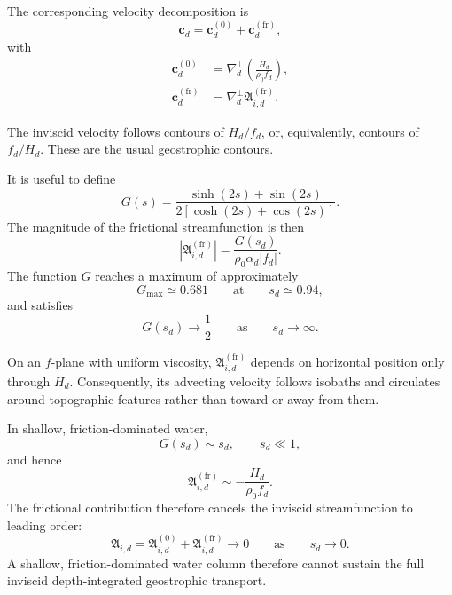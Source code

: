 \documentclass[10pt]{amsart}
\begin{document}
The corresponding velocity decomposition is
\begin{equation}
\boldsymbol c_d
=
\boldsymbol c_d^{(0)}
+
\boldsymbol c_d^{(\mathrm{fr})},
\end{equation}
with
\begin{subequations}
\begin{align}
\boldsymbol c_d^{(0)}
&=
\nabla_d^\perp
\left(
\frac{H_d}{\rho_0f_d}
\right),
\\
\boldsymbol c_d^{(\mathrm{fr})}
&=
\nabla_d^\perp
\mathfrak A_{i,d}^{(\mathrm{fr})}.
\end{align}
\end{subequations}

The inviscid velocity follows contours of \(H_d/f_d\), or,
equivalently, contours of \(f_d/H_d\). These are the usual
geostrophic contours.

It is useful to define
\begin{equation}
G(s)
=
\frac{
\sinh(2s)+\sin(2s)
}{
2\left[
\cosh(2s)+\cos(2s)
\right]
}.
\end{equation}
The magnitude of the frictional streamfunction is then
\begin{equation}
\left|
\mathfrak A_{i,d}^{(\mathrm{fr})}
\right|
=
\frac{G(s_d)}
{\rho_0\alpha_d|f_d|}.
\end{equation}
The function \(G\) reaches a maximum of approximately
\begin{equation}
G_{\max}\simeq0.681
\qquad\text{at}\qquad
s_d\simeq0.94,
\end{equation}
and satisfies
\begin{equation}
G(s_d)\longrightarrow\frac{1}{2}
\qquad\text{as}\qquad
s_d\longrightarrow\infty.
\end{equation}

On an \(f\)-plane with uniform viscosity,
\(\mathfrak A_{i,d}^{(\mathrm{fr})}\) depends on horizontal position
only through \(H_d\). Consequently, its advecting velocity follows
isobaths and circulates around topographic features rather than
toward or away from them.

In shallow, friction-dominated water,
\begin{equation}
G(s_d)\sim s_d,
\qquad
s_d\ll1,
\end{equation}
and hence
\begin{equation}
\mathfrak A_{i,d}^{(\mathrm{fr})}
\sim
-\frac{H_d}{\rho_0f_d}.
\end{equation}
The frictional contribution therefore cancels the inviscid
streamfunction to leading order:
\begin{equation}
\mathfrak A_{i,d}
=
\mathfrak A_{i,d}^{(0)}
+
\mathfrak A_{i,d}^{(\mathrm{fr})}
\longrightarrow0
\qquad
\text{as}
\qquad
s_d\longrightarrow0.
\end{equation}
A shallow, friction-dominated water column therefore cannot sustain
the full inviscid depth-integrated geostrophic transport.
\end{document}
